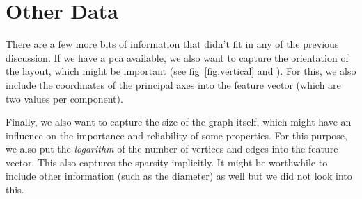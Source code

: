 \documentclass{graphstudy}
\begin{document}
\begin{Figure}
  \begin{center}
  \end{center}
  \caption[Differential Entropy of ]{%
    Differential entropies of the density functions obtained via computing sliding averages (with a Gaussian filter
    width chosen according to Scott's normal reference rule) for the \(\menum{RDF\_LOCAL}(d)\) properties for for the
    four layouts shown in \acl{fig}~\ref{fig:demograph-x} plotted as a function of \(\log_2(d)\).  The first thing to
    notice is that -- unlike pointed out for the entropy of histograms -- using Scott's normal reference rule for the
    selection of the filter width does not seem to predetermine the entropy value.  (Note that the ordinate does not
    start at zero, though.)  The distribution for the  layout clearly stands out.  It meets the
    expectation that its value is mostly independent of the parameter \(d\) as the layout does not make use of the
    graph's structure at all.  The data points for the  and  layout are almost identical with a
    smaller difference to the worsened layout, which is all as expected.  The linear regression curves for all layouts
    but  do not approximate the data very well.
  }
  \label{fig:diffent-rdf-local}
\end{Figure}

\section{Other Data}

There are a few more bits of information that didn't fit in any of the previous discussion.  If we have a \ac{pca}
available, we also want to capture the orientation of the layout, which might be important (see
\acs{fig}~\ref{fig:vertical} and \textcite{Giannouli2013}).  For this, we also include the coordinates of the principal
axes into the feature vector (which are two values per component).

Finally, we also want to capture the size of the graph itself, which might have an influence on the importance and
reliability of some properties.  For this purpose, we also put the \emph{logarithm} of the number of vertices and edges
into the feature vector.  This also captures the sparsity implicitly.  It might be worthwhile to include other
information (such as the diameter) as well but we did not look into this.
\end{document}
